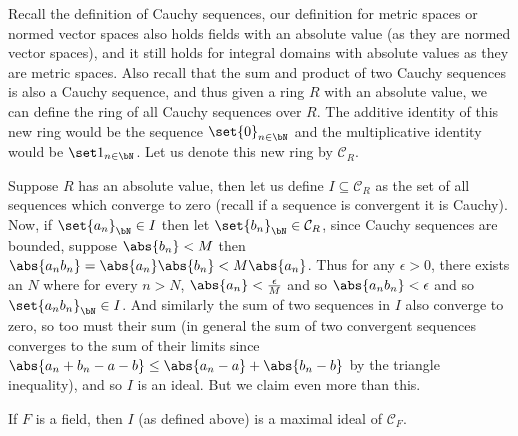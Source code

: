 \documentclass[10pt]{article}
\def\mC{\mathcal C}
\begin{document}


\bigskip

Recall the definition of Cauchy sequences, our definition for metric spaces or normed vector spaces also holds fields with an absolute value (as they are normed vector spaces), and it still holds for
integral domains with absolute values as they are metric spaces.
Also recall that the sum and product of two Cauchy sequences is also a Cauchy sequence, and thus given a ring $R$ with an absolute value, we can define the ring of all Cauchy sequences over $R$.
The additive identity of this new ring would be the sequence $\set{0}_{n\in\bN}$ and the multiplicative identity would be $\set1_{n\in\bN}$.
Let us denote this new ring by $\mC_R$.

Suppose $R$ has an absolute value, then let us define $I\subseteq\mC_R$ as the set of all sequences which converge to zero (recall if a sequence is convergent it is Cauchy).
Now, if $\set{a_n}_\bN\in I$ then let $\set{b_n}_\bN\in\mC_R$, since Cauchy sequences are bounded, suppose $\abs{b_n}<M$ then $\abs{a_nb_n}=\abs{a_n}\abs{b_n}<M\abs{a_n}$.
Thus for any $\epsilon>0$, there exists an $N$ where for every $n>N$, $\abs{a_n}<\frac\epsilon M$ and so $\abs{a_nb_n}<\epsilon$ and so $\set{a_nb_n}_\bN\in I$.
And similarly the sum of two sequences in $I$ also converge to zero, so too must their sum (in general the sum of two convergent sequences converges to the sum of their limits since
$\abs{a_n+b_n-a-b}\leq\abs{a_n-a}+\abs{b_n-b}$ by the triangle inequality), and so $I$ is an ideal.
But we claim even more than this.

\begin{prop*}

    If $F$ is a field, then $I$ (as defined above) is a maximal ideal of $\mC_F$.

\end{prop*}
\end{document}
